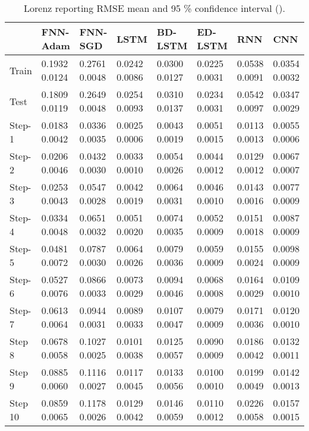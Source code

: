 \documentclass[final,5p,times,twocolumn]{elsarticle}
\begin{document}
\begin{table*}[htbp]
 \small 
\begin{tabular}{llllllll}
\hline
 &  FNN-Adam& FNN-SGD & LSTM & BD-LSTM  & ED-LSTM & RNN & CNN\\
\hline
\hline
	
Train &  
0.1932	0.0124&
0.2761	0.0048&
0.0242	0.0086&
0.0300	0.0127&
0.0225	0.0031&
0.0538	0.0091&0.0354	0.0032\\
Test &  
0.1809	0.0119&
0.2649	0.0048&
0.0254	0.0093&
0.0310	0.0137&
0.0234	0.0031&
0.0542	0.0097&	0.0347	0.0029\\
Step-1 &  
0.0183	0.0042&
0.0336	0.0035&
0.0025	0.0006&
0.0043	0.0019&
0.0051	0.0015&
0.0113	0.0013&	0.0055	0.0006\\
Step-2 &  
0.0206	0.0046&
0.0432	0.0030&
0.0033	0.0010&
0.0054	0.0026&
0.0044	0.0012&
0.0129	0.0012&	0.0067	0.0007\\
Step-3 &    
0.0253	0.0043&
0.0547	0.0028&
0.0042	0.0019&
0.0064	0.0031&
0.0046	0.0010&
0.0143	0.0016&	0.0077	0.0009\\
Step-4 &    
0.0334	0.0048&
0.0651	0.0032&
0.0051	0.0020&
0.0074	0.0035&
0.0052	0.0009&
0.0151	0.0018&0.0087	0.0009\\
Step-5 &    
0.0481	0.0072&
0.0787	0.0030&
0.0064	0.0026&
0.0079	0.0036&
0.0059	0.0009&
0.0155	0.0024&	0.0098	0.0009\\
Step-6 &    
0.0527	0.0076&
0.0866	0.0033&
0.0073	0.0029&
0.0094	0.0046&
0.0068	0.0008&
0.0164	0.0029&	0.0109	0.0010\\
Step-7 &    
0.0613	0.0064&
0.0944	0.0031&
0.0089	0.0033&
0.0107	0.0047&
0.0079	0.0009&
0.0171	0.0036&	0.0120	0.0010\\
Step 8 &    
0.0678	0.0058&
0.1027	0.0025&
0.0101	0.0038&
0.0125	0.0057&
0.0090	0.0009&
0.0186	0.0042&	0.0132	0.0011\\
Step 9 &    
0.0885	0.0060&
0.1116	0.0027&
0.0117	0.0045&
0.0133	0.0056&
0.0100	0.0010&
0.0199	0.0049&	0.0142	0.0013\\
Step 10 &    
0.0859	0.0065&
0.1178	0.0026&
0.0129	0.0042&
0.0146	0.0059&
0.0110	0.0012&
0.0226	0.0058&	0.0157	0.0015\\
\hline
 
\end{tabular}
\caption{Lorenz reporting RMSE mean and 95 \% confidence interval   ().}
\label{tab:lorenz}
\end{table*}
\end{document}
